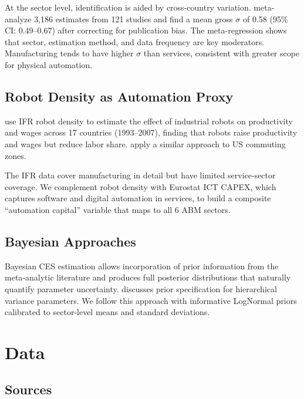 \documentclass[11pt,a4paper]{article}
\begin{document}
At the sector level, identification is aided by cross-country variation.
\autocite{knoblach2020what} meta-analyze 3,186 estimates from 121 studies and find a mean gross $\sigma$ of 0.58 (95\% CI: 0.49--0.67) after correcting for publication bias.
The meta-regression shows that sector, estimation method, and data frequency are key moderators.
Manufacturing tends to have higher $\sigma$ than services, consistent with greater scope for physical automation.

\subsection{Robot Density as Automation Proxy}

\autocite{graetz2018robots} use IFR robot density to estimate the effect of industrial robots on productivity and wages across 17 countries (1993--2007), finding that robots raise productivity and wages but reduce labor share.
\autocite{acemoglu2020robots} apply a similar approach to US commuting zones.

The IFR data cover manufacturing in detail but have limited service-sector coverage.
We complement robot density with Eurostat ICT CAPEX, which captures software and digital automation in services, to build a composite ``automation capital'' variable that maps to all 6 ABM sectors.

\subsection{Bayesian Approaches}

Bayesian CES estimation allows incorporation of prior information from the meta-analytic literature and produces full posterior distributions that naturally quantify parameter uncertainty.
\autocite{gelman2006prior} discusses prior specification for hierarchical variance parameters.
We follow this approach with informative LogNormal priors calibrated to \autocite{knoblach2020what} sector-level means and standard deviations.


\section{Data}
\label{sec:data}

\subsection{Sources}
\end{document}
